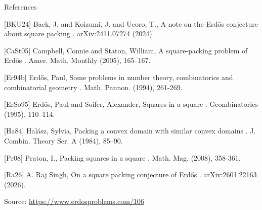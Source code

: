 \documentclass{article}
\begin{document}
References

[BKU24] Baek, J. and Koizumi, J. and Ueoro, T., A note on the Erd\H{o}s conjecture about square packing . arXiv:2411.07274 (2024).

[CaSt05] Campbell, Connie and Staton, William, A square-packing problem of Erd\H{o}s . Amer. Math. Monthly (2005), 165--167.

[Er94b] Erd\H{o}s, Paul, Some problems in number theory, combinatorics and combinatorial geometry . Math. Pannon. (1994), 261-269.

[ErSo95] Erd\H{o}s, Paul and Soifer, Alexander, Squares in a square . Geombinatorics (1995), 110--114.

[Ha84] Hal\'{a}sz, Sylvia, Packing a convex domain with similar convex domains . J. Combin. Theory Ser. A (1984), 85--90.

[Pr08] Praton, I., Packing squares in a square . Math. Mag. (2008), 358-361.

[Ra26] A. Raj Singh, On a square packing conjecture of Erd\H{o}s . arXiv:2601.22163 (2026).

\bigskip
\noindent\small{Source: \url{https://www.erdosproblems.com/106}}
\end{document}
